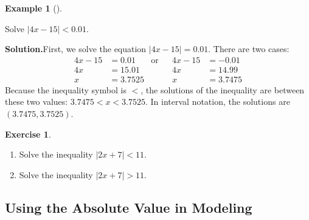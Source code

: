 \documentclass[10pt,]{book}
\theoremstyle{plain}
\theoremstyle{definition}
\theoremstyle{definition}
\theoremstyle{definition}
\newtheorem{example}[theorem]{Example}
\theoremstyle{definition}
\theoremstyle{definition}
\newtheorem{exercise}[theorem]{Exercise}
\numberwithin{equation}{section}
\newcommand\abs[1]{\left|#1\right|}
\newcommand{\lt}{ < }
\newcommand{\gt}{ > }
\newcommand{\amp}{ & }
\begin{document}
%
\begin{example}[]\label{example-abs-inequality}

    Solve \(\abs{4x − 15} \lt 0.01\).
%
\par\medskip\noindent%
\textbf{Solution.}\quad First, we solve the equation \(\abs{4x − 15} = 0.01\). There are two cases:
    \begin{equation*}
        \begin{aligned}
        4x − 15 \amp = 0.01 \amp \text{or} \amp\amp 4x − 15 \amp= −0.01 \\
        4x \amp = 15.01 \amp\amp\amp 4x \amp = 14.99 \\
        x \amp = 3.7525 \amp\amp\amp x \amp= 3.7475
        \end{aligned}
    \end{equation*}
        Because the inequality symbol is \(\lt\), the solutions of the inequality are between these two values: \(3.7475 \lt x \lt 3.7525\). In interval notation, the solutions are \((3.7475, 3.7525)\).
\end{example}
\begin{exercise}\label{exercise-solve-abs-algebraic2}
\leavevmode%
\begin{enumerate}[label=*\alph**]
\item\hypertarget{li-359}{}Solve the inequality \(\abs{2x + 7} \lt 11\).\item\hypertarget{li-360}{}Solve the inequality \(\abs{2x + 7} \gt 11\).\end{enumerate}
\end{exercise}
\typeout{************************************************}
\typeout{************************************************}
\subsection[Using the Absolute Value in Modeling]{Using the Absolute Value in Modeling}\label{subsection-50}
\end{document}
